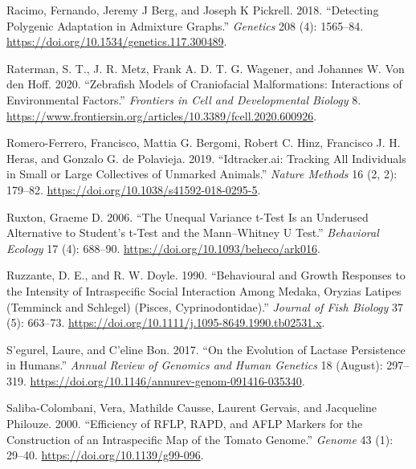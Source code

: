 \documentclass[
]{book}
\newlength{\cslhangindent}
\newlength{\cslentryspacingunit} %
\newenvironment{CSLReferences}[2] %
 {%
  \setlength{\parindent}{0pt}
  \ifodd #1
  \let\oldpar\par
  \def\par{\hangindent=\cslhangindent\oldpar}
  \fi
  \setlength{\parskip}{#2\cslentryspacingunit}
 }%
 {}
\begin{document}
\begin{CSLReferences}{1}{0}
\leavevmode{}%
Racimo, Fernando, Jeremy J Berg, and Joseph K Pickrell. 2018. {``Detecting {Polygenic Adaptation} in {Admixture Graphs}.''} \emph{Genetics} 208 (4): 1565--84. \url{https://doi.org/10.1534/genetics.117.300489}.

\leavevmode{}%
Raterman, S. T., J. R. Metz, Frank A. D. T. G. Wagener, and Johannes W. Von den Hoff. 2020. {``Zebrafish {Models} of {Craniofacial Malformations}: {Interactions} of {Environmental Factors}.''} \emph{Frontiers in Cell and Developmental Biology} 8. \url{https://www.frontiersin.org/articles/10.3389/fcell.2020.600926}.

\leavevmode{}%
Romero-Ferrero, Francisco, Mattia G. Bergomi, Robert C. Hinz, Francisco J. H. Heras, and Gonzalo G. de Polavieja. 2019. {``Idtracker.ai: Tracking All Individuals in Small or Large Collectives of Unmarked Animals.''} \emph{Nature Methods} 16 (2, 2): 179--82. \url{https://doi.org/10.1038/s41592-018-0295-5}.

\leavevmode{}%
Ruxton, Graeme D. 2006. {``The Unequal Variance t-Test Is an Underused Alternative to {Student}'s t-Test and the {Mann}--{Whitney U} Test.''} \emph{Behavioral Ecology} 17 (4): 688--90. \url{https://doi.org/10.1093/beheco/ark016}.

\leavevmode{}%
Ruzzante, D. E., and R. W. Doyle. 1990. {``Behavioural and Growth Responses to the Intensity of Intraspecific Social Interaction Among Medaka, {Oryzias} Latipes ({Temminck} and {Schlegel}) ({Pisces}, {Cyprinodontidae}).''} \emph{Journal of Fish Biology} 37 (5): 663--73. \url{https://doi.org/10.1111/j.1095-8649.1990.tb02531.x}.

\leavevmode{}%
S'egurel, Laure, and C'eline Bon. 2017. {``On the {Evolution} of {Lactase Persistence} in {Humans}.''} \emph{Annual Review of Genomics and Human Genetics} 18 (August): 297--319. \url{https://doi.org/10.1146/annurev-genom-091416-035340}.

\leavevmode{}%
Saliba-Colombani, Vera, Mathilde Causse, Laurent Gervais, and Jacqueline Philouze. 2000. {``Efficiency of {RFLP}, {RAPD}, and {AFLP} Markers for the Construction of an Intraspecific Map of the Tomato Genome.''} \emph{Genome} 43 (1): 29--40. \url{https://doi.org/10.1139/g99-096}.


\end{CSLReferences}
\end{document}
